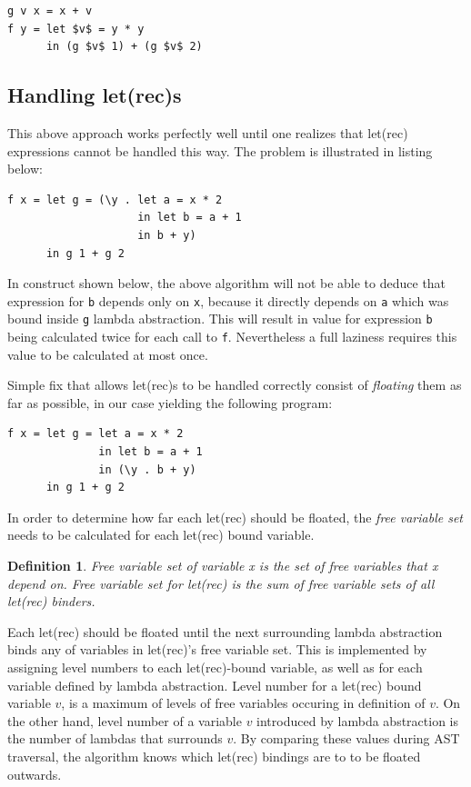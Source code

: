 \documentclass[12pt,a4paper]{report}
\newtheorem{definition}{Definition}[chapter]
\begin{document}
\vspace*{0.2in}
\begin{lstlisting}[style=haskell,mathescape=true]
g v x = x + v
f y = let $v$ = y * y
      in (g $v$ 1) + (g $v$ 2)
\end{lstlisting}

\subsection{Handling let(rec)s}
This above approach works perfectly well until one realizes that let(rec)
expressions cannot be handled this way. The problem is illustrated in listing
below:

\vspace*{0.2in}
\begin{lstlisting}[style=haskell]
f x = let g = (\y . let a = x * 2
                    in let b = a + 1
                    in b + y)
      in g 1 + g 2
\end{lstlisting}

In construct shown below, the above algorithm will not be able to deduce that
expression for \texttt{b} depends only on \texttt{x}, because it directly
depends on \texttt{a} which was bound inside \texttt{g} lambda abstraction.
This will result in value for expression \texttt{b} being calculated twice for
each call to \texttt{f}. Nevertheless a full laziness requires this value to
be calculated at most once.

Simple fix that allows let(rec)s to be handled correctly consist of
\textit{floating} them as far as possible, in our case yielding the following
program:

\vspace*{0.2in}
\begin{lstlisting}[style=haskell]
f x = let g = let a = x * 2
              in let b = a + 1
              in (\y . b + y)
      in g 1 + g 2
\end{lstlisting}

In order to determine how far each let(rec) should be floated, the \textit{free
variable set} needs to be calculated for each let(rec) bound variable.

\begin{definition}
  Free variable set of variable x is the set of free variables
  that x depend on. Free variable set for let(rec) is the sum of free
  variable sets of all let(rec) binders.
\end{definition}

Each let(rec) should be floated until the next surrounding lambda abstraction
binds any of variables in let(rec)'s free variable set. This is implemented by
assigning level numbers to each let(rec)-bound variable, as well as for each
variable defined by lambda abstraction. Level number for a let(rec) bound
variable $v$, is a maximum of levels of free variables occuring in definition
of $v$. On the other hand, level number of a variable $v$ introduced by lambda
abstraction is the number of lambdas that surrounds $v$. By comparing these
values during AST traversal, the algorithm knows which let(rec) bindings are to
to be floated outwards.
\end{document}
